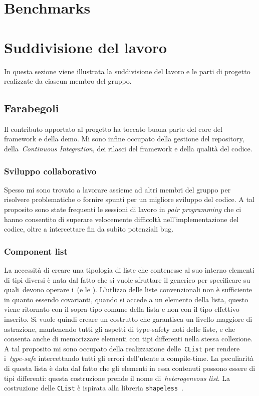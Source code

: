\section{Benchmarks}\label{sec:benchmarks}

\section{Suddivisione del lavoro}\label{sec:suddivisione-del-lavoro}
In questa sezione viene illustrata la suddivisione del lavoro e le parti di progetto realizzate da ciascun membro del
gruppo.

\subsection{Farabegoli}\label{subsec:farabegoli}
Il contributo apportato al progetto ha toccato buona parte del core del framework e della demo.
Mi sono infine occupato della gestione del repository, della~\textit{Continuous Integration}, dei rilasci del framework
e della qualità del codice.

\subsubsection{Sviluppo collaborativo}
Spesso mi sono trovato a lavorare assieme ad altri membri del gruppo per risolvere problematiche o fornire spunti per
un migliore sviluppo del codice.
A tal proposito sono state frequenti le sessioni di lavoro in \textit{pair programming} che ci hanno consentito di
superare velocemente difficoltà nell'implementazione del codice, oltre a intercettare fin da subito potenziali bug.

\subsubsection{Component list}
La necessità di creare una tipologia di liste che contenesse al suo interno elementi di tipi diversi è nata dal fatto
che si vuole sfruttare il generico per specificare su quali~\Component devono operare i~\System (e le \View).
L'utlizzo delle liste convenzionali non è sufficiente in quanto essendo covarianti, quando si accede a un elemento della
lista, questo viene ritornato con il sopra-tipo comune della lista e non con il tipo effettivo inserito.
Si vuole quindi creare un costrutto che garantisca un livello maggiore di astrazione, mantenendo tutti gli aspetti
di type-safety noti delle liste, e che consenta anche di memorizzare elementi con tipi differenti nella stessa
collezione.
A tal proposito mi sono occupato della realizzazione delle~\texttt{CList} per rendere i~\System \textit{type-safe}
intercettando tutti gli errori dell'utente a compile-time.
La peculiarità di questa lista è data dal fatto che gli elementi in essa contenuti possono essere di tipi differenti:
questa costruzione prende il nome di~\textit{heterogeneous list}.
La costruzione delle \texttt{CList} è ispirata alla libreria \texttt{shapeless}~\cite{shapeless}.

